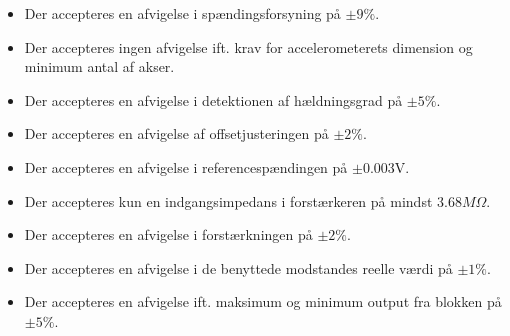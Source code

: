 \begin{itemize}
	\item Der accepteres en afvigelse i spændingsforsyning på $\pm9\%$.
	\item Der accepteres ingen afvigelse ift. krav for accelerometerets dimension og minimum antal af akser.
	\item Der accepteres en afvigelse i detektionen af hældningsgrad på $\pm5\%$.
	\item Der accepteres en afvigelse af offsetjusteringen på $\pm2\%$.
	\item Der accepteres en afvigelse i referencespændingen på $\pm0.003$V.
	\item Der accepteres kun en indgangsimpedans i forstærkeren på mindst $3.68M\Omega$.
	\item Der accepteres en afvigelse i forstærkningen på $\pm2\%$.
	\item Der accepteres en afvigelse i de benyttede modstandes reelle værdi på $\pm1\%$.
	\item Der accepteres en afvigelse ift. maksimum og minimum output fra blokken på $\pm5\%$.
\end{itemize}
